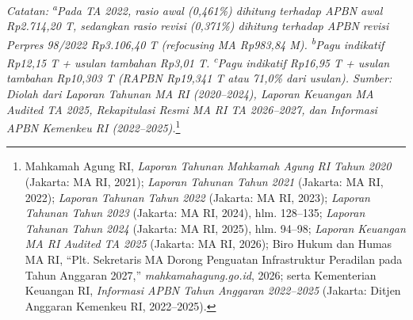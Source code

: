 \documentclass[12pt,a4paper,twocolumn]{article}
\begin{document}
\begin{table}[t]
\begin{minipage}{\textwidth}
        \footnotesize \textit{Catatan: \textsuperscript{a}Pada TA 2022, rasio awal (0,461\%) dihitung terhadap APBN awal Rp2.714,20 T, sedangkan rasio revisi (0,371\%) dihitung terhadap APBN revisi Perpres 98/2022 Rp3.106,40 T (\textit{refocusing} MA Rp983,84 M). \textsuperscript{b}Pagu indikatif Rp12,15 T + usulan tambahan Rp3,01 T. \textsuperscript{c}Pagu indikatif Rp16,95 T + usulan tambahan Rp10,303 T (RAPBN Rp19,341 T atau 71,0\% dari usulan). Sumber: Diolah dari Laporan Tahunan MA RI (2020--2024), Laporan Keuangan MA Audited TA 2025, Rekapitulasi Resmi MA RI TA 2026--2027, dan Informasi APBN Kemenkeu RI (2022--2025).}\footnote{Mahkamah Agung RI, \textit{Laporan Tahunan Mahkamah Agung RI Tahun 2020} (Jakarta: MA RI, 2021); \textit{Laporan Tahunan Tahun 2021} (Jakarta: MA RI, 2022); \textit{Laporan Tahunan Tahun 2022} (Jakarta: MA RI, 2023); \textit{Laporan Tahunan Tahun 2023} (Jakarta: MA RI, 2024), hlm. 128--135; \textit{Laporan Tahunan Tahun 2024} (Jakarta: MA RI, 2025), hlm. 94--98; \textit{Laporan Keuangan MA RI Audited TA 2025} (Jakarta: MA RI, 2026); Biro Hukum dan Humas MA RI, ``Plt. Sekretaris MA Dorong Penguatan Infrastruktur Peradilan pada Tahun Anggaran 2027,'' \textit{mahkamahagung.go.id}, 2026; serta Kementerian Keuangan RI, \textit{Informasi APBN Tahun Anggaran 2022--2025} (Jakarta: Ditjen Anggaran Kemenkeu RI, 2022--2025).}
    \end{minipage}
\end{table}
\end{document}

